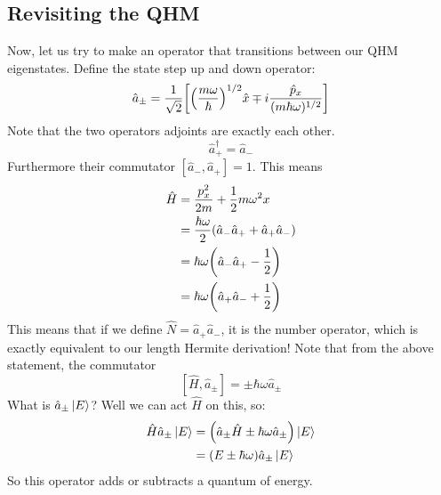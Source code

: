 \subsection{Revisiting the QHM}
Now, let us try to
make an operator that transitions between our QHM eigenstates. Define the state step up and down operator:
\[ \hat{a}_{\pm} = \frac{1}{\sqrt{2}} \qty[\qty(\frac{m\omega}{\hbar})^{1/2} \hat{x} \mp i \frac{\hat{p}_x}{(m\hbar \omega)^{1/2}}] \]
Note that the two operators adjoints are exactly each other.
\[ \hat{a}_{+}^{\dagger} = \hat{a}_{-} \]
Furthermore their commutator $[\hat{a}_{-}, \hat{a}_{+}] = 1$. This means
\begin{align*}
    \hat{H} &= \frac{p_x^2}{2m} + \frac{1}{2} m \omega^2 x \\
    &= \frac{\hbar \omega}{2} \qty(\hat{a}_{-} \hat{a}_{+} + \hat{a}_{+} \hat{a}_{-}) \\
    &= \hbar \omega \qty(\hat{a}_{-} \hat{a}_{+} - \frac{1}{2}) \\
    &= \hbar \omega \qty(\hat{a}_{+} \hat{a}_{-} + \frac{1}{2})
\end{align*}
This means that if we define $\hat{N} = \hat{a}_{+} \hat{a}_{-}$, it is the number operator,
which is exactly equivalent to our length Hermite derivation! Note that from the above statement, the commutator
\[ [\hat{H}, \hat{a}_{\pm}] = \pm \hbar \omega \hat{a}_{\pm} \]
What is $\hat{a}_{\pm} \ket*{E}$? Well we can act $\hat{H}$ on this, so:
\begin{align*}
    \hat{H} \hat{a}_{\pm} \ket*{E} &= \qty(\hat{a}_{\pm} \hat{H} \pm \hbar \omega \hat{a}_{\pm}) \ket*{E} \\
    &= \qty(E \pm \hbar \omega) \hat{a}_{\pm} \ket*{E}
\end{align*}
So this operator adds or subtracts a quantum of energy.
